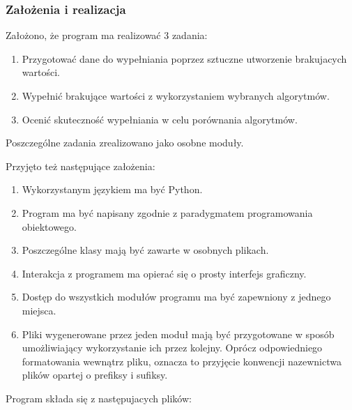 \documentclass[12pt,twoside]{article}
\begin{document}
\subsubsection{Założenia i realizacja}
Założono, że program ma realizować 3 zadania:

\begin{enumerate}[label=\arabic*), leftmargin=1.25cm]
    \item Przygotować dane do wypełniania poprzez sztuczne utworzenie brakujacych wartości.
    \item Wypełnić brakujące wartości z wykorzystaniem wybranych algorytmów.
    \item Ocenić skuteczność wypełniania w celu porównania algorytmów.
\end{enumerate}

Poszczególne zadania zrealizowano jako osobne moduły.

\vspace{5mm}
Przyjęto też następujące założenia:

\begin{enumerate}[label=\arabic*), leftmargin=1.25cm]
    \item Wykorzystanym językiem ma być Python.
    \item Program ma być napisany zgodnie z paradygmatem programowania obiektowego.
    \item Poszczególne klasy mają być zawarte w osobnych plikach.
    \item Interakcja z programem ma opierać się o prosty interfejs graficzny.
    \item Dostęp do wszystkich modułów programu ma być zapewniony z jednego miejsca.
    \item Pliki wygenerowane przez jeden moduł mają być przygotowane w sposób umożliwiający
          wykorzystanie ich przez kolejny. Oprócz odpowiedniego formatowania wewnątrz pliku,
          oznacza to przyjęcie konwencji nazewnictwa plików opartej o prefiksy i sufiksy.
\end{enumerate}

Program składa się z następujacych plików:
\end{document}
